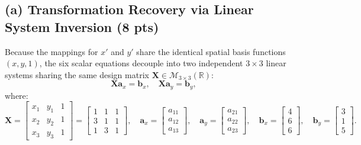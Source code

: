 \documentclass[11pt,a4paper]{article}
\begin{document}
\subsection{(a) Transformation Recovery via Linear System Inversion (8 pts)}
Because the mappings for $x'$ and $y'$ share the identical spatial basis functions $(x, y, 1)$, the six scalar equations decouple into two independent $3 \times 3$ linear systems sharing the same design matrix $\mathbf{X} \in \mathcal{M}_{3 \times 3}(\mathbb{R})$:
\begin{equation}
\mathbf{X} \mathbf{a}_x = \mathbf{b}_x, \quad \mathbf{X} \mathbf{a}_y = \mathbf{b}_y,
\end{equation}
where:
\begin{equation}
\mathbf{X} = \begin{bmatrix} x_1 & y_1 & 1 \\ x_2 & y_2 & 1 \\ x_3 & y_3 & 1 \end{bmatrix} = \begin{bmatrix} 1 & 1 & 1 \\ 3 & 1 & 1 \\ 1 & 3 & 1 \end{bmatrix}, \quad \mathbf{a}_x = \begin{bmatrix} a_{11} \\ a_{12} \\ a_{13} \end{bmatrix}, \quad \mathbf{a}_y = \begin{bmatrix} a_{21} \\ a_{22} \\ a_{23} \end{bmatrix}, \quad \mathbf{b}_x = \begin{bmatrix} 4 \\ 6 \\ 6 \end{bmatrix}, \quad \mathbf{b}_y = \begin{bmatrix} 3 \\ 1 \\ 5 \end{bmatrix}.
\end{equation}
\end{document}
